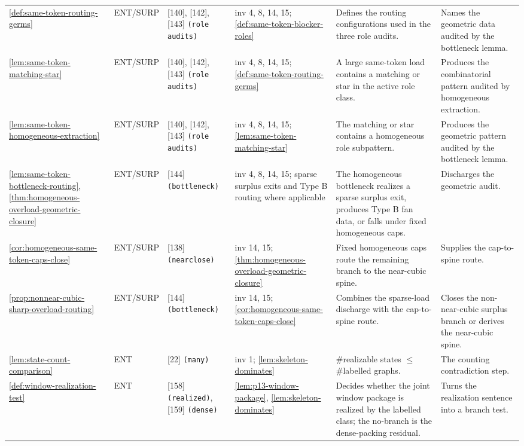 \documentclass[11pt]{article}
\begin{document}
{\begin{longtable}{L{0.10\textwidth} C{0.045\textwidth} L{0.13\textwidth} L{0.135\textwidth} L{0.28\textwidth} L{0.20\textwidth}}
\cref{def:same-token-routing-germs} & ENT\slash SURP & [140], [142], [143] \texttt{(role audits)} & inv 4, 8, 14, 15; \cref{def:same-token-blocker-roles} & Defines the routing configurations used in the three role audits. & Names the geometric data audited by the bottleneck lemma. \\
\cref{lem:same-token-matching-star} & ENT\slash SURP & [140], [142], [143] \texttt{(role audits)} & inv 4, 8, 14, 15; \cref{def:same-token-routing-germs} & A large same-token load contains a matching or star in the active role class. & Produces the combinatorial pattern audited by homogeneous extraction. \\
\cref{lem:same-token-homogeneous-extraction} & ENT\slash SURP & [140], [142], [143] \texttt{(role audits)} & inv 4, 8, 14, 15; \cref{lem:same-token-matching-star} & The matching or star contains a homogeneous role subpattern. & Produces the geometric pattern audited by the bottleneck lemma. \\
\cref{lem:same-token-bottleneck-routing}, \cref{thm:homogeneous-overload-geometric-closure} & ENT\slash SURP & [144] \texttt{(bottleneck)} & inv 4, 8, 14, 15; sparse surplus exits and Type B routing where applicable & The homogeneous bottleneck realizes a sparse surplus exit, produces Type B fan data, or falls under fixed homogeneous caps. & Discharges the geometric audit. \\
\cref{cor:homogeneous-same-token-caps-close} & ENT\slash SURP & [138] \texttt{(nearclose)} & inv 14, 15; \cref{thm:homogeneous-overload-geometric-closure} & Fixed homogeneous caps route the remaining branch to the near-cubic spine. & Supplies the cap-to-spine route. \\
\cref{prop:nonnear-cubic-sharp-overload-routing} & ENT\slash SURP & [144] \texttt{(bottleneck)} & inv 14, 15; \cref{cor:homogeneous-same-token-caps-close} & Combines the sparse-load discharge with the cap-to-spine route. & Closes the non-near-cubic surplus branch or derives the near-cubic spine. \\
\cref{lem:state-count-comparison} & ENT & [22] \texttt{(many)} & inv 1; \cref{lem:skeleton-dominates} & \#realizable states $\le$ \#labelled graphs. & The counting contradiction step. \\
\cref{def:window-realization-test} & ENT & [158] \texttt{(realized)}, [159] \texttt{(dense)} & \cref{lem:p13-window-package}, \cref{lem:skeleton-dominates} & Decides whether the joint window package is realized by the labelled class; the no-branch is the dense-packing residual. & Turns the realization sentence into a branch test. \\

\end{longtable}}
\end{document}
